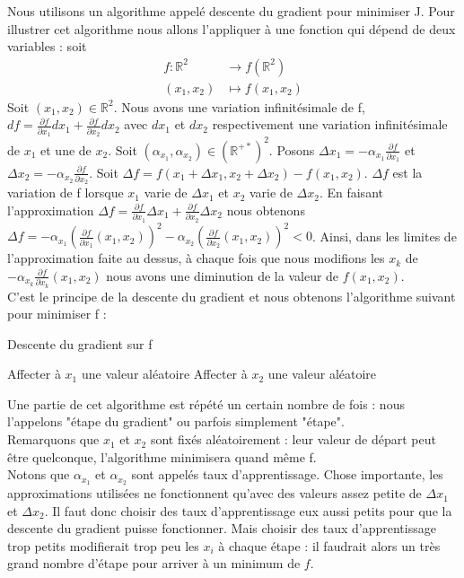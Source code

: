 \documentclass[a4paper,10pt]{article}
\begin{document}
Nous utilisons un algorithme appelé descente du gradient pour minimiser J. Pour illustrer cet algorithme nous allons l'appliquer à une fonction qui dépend de deux variables : soit
\begin{align*}
f\colon \mathbb{R}^2&\longrightarrow f(\mathbb{R}^2)\\
(x_1, x_2)&\longmapsto f(x_1, x_2)
\end{align*}
Soit $(x_1, x_2) \in \mathbb{R}^2$. Nous avons une variation infinitésimale de f, $df = \frac{\partial f}{\partial x_{1}}d x_{1} + \frac{\partial f}{\partial x_{2}}dx_{2}$ avec $dx_1$ et $dx_2$ respectivement une variation infinitésimale de $x_1$ et une de $x_2$. 
Soit $(\alpha_{x_1}, \alpha_{x_2}) \in (\mathbb{R}^{+*})^2$. 
 Posons $\Delta x_{1} = -\alpha_{x_1} \frac{\partial f}{\partial x_{1}}$
 et $\Delta x_{2} = -\alpha_{x_2} \frac{\partial f}{\partial x_{2}}$. Soit $\Delta f = f(x_1 + \Delta x_1, x_2 + \Delta x_2) - f(x_1, x_2)$. $\Delta f$ est la variation de f lorsque $x_1$ varie de $\Delta x_1$ et $x_2$ varie de $\Delta x_2$. 
En faisant l'approximation $\Delta f = \frac{\partial f}{\partial x_{1}}\Delta  x_{1} + \frac{\partial f}{\partial x_{2}}\Delta x_{2}$ nous obtenons $\Delta f = -\alpha_{x_1} (\frac{\partial f}{\partial x_{1}}(x_1, x_2))^{2} - \alpha_{x_2} (\frac{\partial f}{\partial x_{2}}(x_1, x_2))^{2} < 0$. Ainsi, dans
 les limites de l'approximation faite au dessus, à chaque fois que nous modifions les $x_{k}$ de $- \alpha_{x_k} \frac{\partial f}{\partial x_{k}}(x_1, x_2)$
 nous avons une diminution de la valeur de $f(x_1, x_2)$.\\

C'est le principe de la descente du gradient et nous obtenons l'algorithme suivant pour minimiser f :
\begin{algorithm}
\caption{Descente du gradient sur f}
\BlankLine
Affecter à $x_1$ une valeur aléatoire\;
Affecter à $x_2$ une valeur aléatoire\;
\BlankLine
\end{algorithm}

\noindent Une partie de cet algorithme est répété un certain nombre de fois : nous l'appelons "étape du gradient" ou parfois simplement "étape".\\
Remarquons que $x_1$ et $x_2$ sont fixés aléatoirement : leur valeur de départ peut être quelconque, l'algorithme minimisera quand même f.\\
Notons que $\alpha_{x_1}$ et $\alpha_{x_2}$ sont appelés taux d'apprentissage.
Chose importante, les approximations utilisées ne fonctionnent qu'avec des valeurs assez petite de $\Delta x_1$ et $\Delta x_2$. Il faut donc choisir des taux d'apprentissage eux aussi petits pour que la descente du gradient puisse fonctionner. Mais choisir des taux d'apprentissage trop petits modifierait trop peu les $x_i$ à chaque étape : il faudrait alors un très grand nombre d'étape pour arriver à un minimum de $f$.\\
\end{document}
